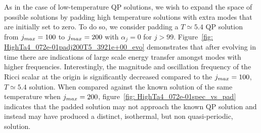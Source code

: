 \documentclass[../PhD.tex]{subfiles}
\begin{document}
As in the case of low-temperature QP solutions, we wish to expand the space of possible solutions by padding high temperature solutions with extra modes that are initially set to zero. To do so, we consider padding a $T \simeq 5.4$ QP solution from $j_{max} = 100$ to $j_{max} = 200$ with $\alpha_j = 0$ for $j > 99$. Figure~\ref{fig: HighTa4_072e-01padj200T5_3921e+00_evo} demonstrates that after evolving in time there are indications of large scale energy transfer amongst modes with higher frequencies. Interestingly, the magnitude and oscillation frequency of the Ricci scalar at the origin is significantly decreased compared to the $j_{max} = 100$, $T \simeq 5.4$ solution. When compared against the known solution of the same temperature when $j_{max} = 200$, figure~\ref{fig: HighTa4_072e-01spec_vs_pad} indicates that the padded solution may not approach the known QP solution and instead may have produced a distinct, isothermal, but non quasi-periodic, solution.

\end{document}

